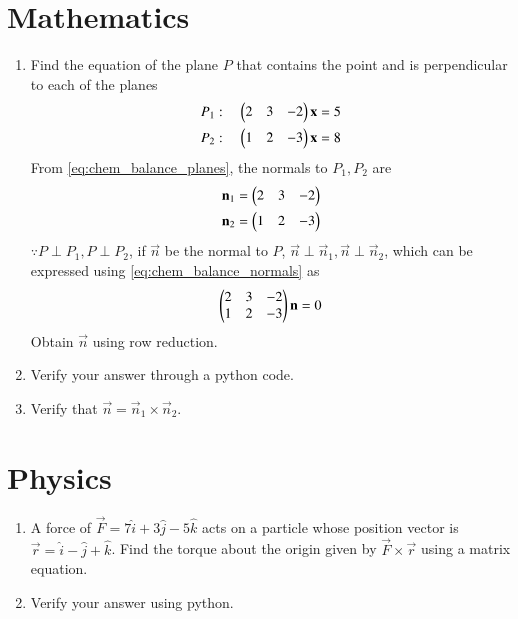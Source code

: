 \documentclass[journal,12pt,twocolumn]{IEEEtran}
\renewcommand\thesection{\arabic{section}}
\begin{document}
\section{Mathematics}
\begin{enumerate}[label=\arabic*.,ref=\thesection.\theenumi]
\item Find the equation of the plane $P$ that contains the point  and is perpendicular to each of the planes
%
\begin{align}
\label{eq:chem_balance_planes}
P_1: \quad \begin{pmatrix}2 & 3 & -2\end{pmatrix}\mathbf{x} &= 5
\\
P_2: \quad \begin{pmatrix}1 & 2 & -3\end{pmatrix}\mathbf{x} &= 8
\end{align}
%
From \eqref{eq:chem_balance_planes}, the normals to $P_1, P_2$ are 
%
\begin{align}
\label{eq:chem_balance_normals}
\begin{split}
\mathbf{n}_1 = \begin{pmatrix}2 & 3 & -2\end{pmatrix}
\\
\mathbf{n}_2 =  \begin{pmatrix}1 & 2 & -3\end{pmatrix}
\end{split}
\end{align}
%
$\because P\perp P_1, P \perp P_2$,  if  $\vec{n}$ be the normal to $P$, $\vec{n}\perp \vec{n}_1, \vec{n}\perp \vec{n}_2 $, which can be expressed using \eqref{eq:chem_balance_normals} as
%
\begin{align}
\label{eq:chem_balance_normals_mat_eq}
 \begin{pmatrix}2 & 3 & -2
\\
1 & 2 & -3
\end{pmatrix}
\mathbf{n} = 0 
\end{align}
%
Obtain $\vec{n}$ using row reduction.
\item Verify your answer through a python code.
\item Verify that $\vec{n} = \vec{n}_1 \times \vec{n}_2$.
\end{enumerate}
\section{Physics}
\begin{enumerate}[label=\arabic*.,ref=\thesection.\theenumi]
\item A force of $\vec{F} = 7\hat{i}+3\hat{j}-5\hat{k}$ acts on a particle whose position vector is $\vec{r} = \hat{i}-\hat{j}+\hat{k}$.  Find the torque about the origin  given by $\vec{F}\times \vec{r}$ using a matrix equation.
\item Verify your answer using python.
\end{enumerate}
\end{document}
